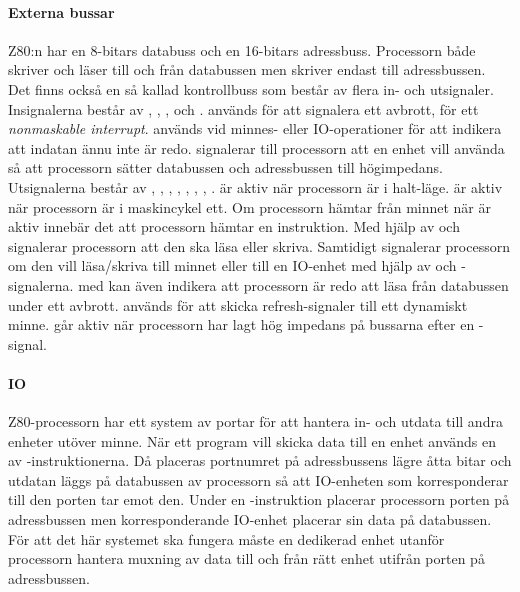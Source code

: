 \documentclass[main.tex]{subfiles}
\begin{document}
\paragraph{Externa bussar}
Z80:n har en 8-bitars databuss och en 16-bitars adressbuss. Processorn både
skriver och läser till och från databussen men skriver endast till
adressbussen. Det finns också en så kallad kontrollbuss som består av flera in-
och utsignaler. Insignalerna består av , , ,
 och .  används för att signalera ett
avbrott,  för ett {\it nonmaskable interrupt}.  används
vid minnes- eller IO-operationer för att indikera att indatan ännu inte är
redo.  signalerar till processorn att en enhet vill använda så att
processorn sätter databussen och adressbussen till högimpedans. Utsignalerna
består av , , , , ,
, , .  är aktiv när processorn är i
halt-läge.  är aktiv när processorn är i maskincykel ett. Om
processorn hämtar från minnet när  är aktiv innebär det att processorn
hämtar en instruktion. Med hjälp av  och  signalerar
processorn att den ska läsa eller skriva. Samtidigt signalerar processorn om
den vill läsa/skriva till minnet eller till en IO-enhet med hjälp av
 och -signalerna.  med  kan även
indikera att processorn är redo att läsa från databussen under ett avbrott.
 används för att skicka refresh-signaler till ett dynamiskt minne.
 går aktiv när processorn har lagt hög impedans på bussarna efter
en -signal.

\paragraph{IO}
Z80-processorn har ett system av portar för att hantera in- och utdata till
andra enheter utöver minne. När ett program vill skicka data till en enhet
används en av -instruktionerna. Då placeras portnumret på
adressbussens lägre åtta bitar och utdatan läggs på databussen av processorn så
att IO-enheten som korresponderar till den porten tar emot den. Under en
-instruktion placerar processorn porten på adressbussen men
korresponderande IO-enhet placerar sin data på databussen. För att det här
systemet ska fungera måste en dedikerad enhet utanför processorn hantera
muxning av data till och från rätt enhet utifrån porten på adressbussen.
\end{document}
